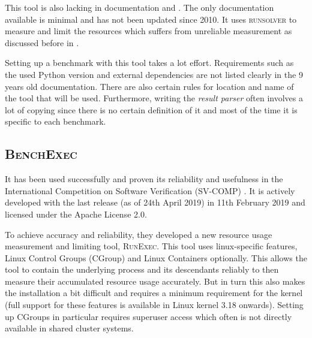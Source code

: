 This tool is also lacking in documentation and .
The only documentation available is minimal and has not been updated since 2010.
It uses \textsc{runsolver} to measure and limit the resources which suffers from unreliable measurement as discussed before in .

Setting up a benchmark with this tool takes a lot effort.
Requirements such as the used Python version and external dependencies are not listed clearly in the 9 years old documentation.
There are also certain rules for location and name of the tool that will be used.
Furthermore, writing the \textit{result parser} often involves a lot of copying since there is no certain definition of it and most of the time it is specific to each benchmark.

\subsection{\textsc{BenchExec}}
\label{sec:benchmarking.impl.benchexec}

It has been used successfully and proven its reliability and usefulness in the International Competition on Software Verification (SV-COMP) \citep{beyerReliableBenchmarkingRequirements2019}.
It is actively developed with the last release (as of 24th April 2019) in 11th February 2019 and licensed under the Apache License 2.0.

To achieve accuracy and reliability, they developed a new resource usage measurement and limiting tool, \textsc{RunExec}.
This tool uses linux-specific features, Linux Control Groups (CGroup) and Linux Containers optionally.
This allows the tool to contain the underlying process and its descendants reliably to then measure their accumulated resource usage accurately.
But in turn this also makes the installation a bit difficult and requires a minimum requirement for the kernel (full support for these features is available in Linux kernel 3.18 onwards).
Setting up CGroups in particular requires superuser access which often is not directly available in shared cluster systems.


